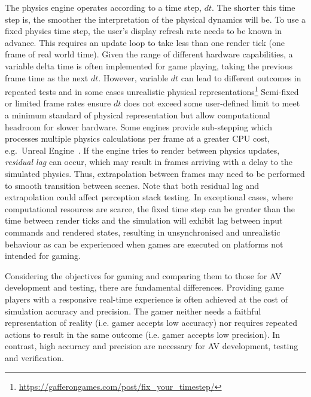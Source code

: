The physics engine operates according to a time step, $dt$. The shorter this time step is, the smoother the interpretation of the physical dynamics will be. To use a fixed physics time step, the user's display refresh rate needs to be known in advance. This requires an update loop to take less than one render tick (one frame of real world time). Given the range of different hardware capabilities, a variable delta time is often implemented for game playing, taking the previous frame time as the next $dt$. However, variable $dt$ can lead to different outcomes in repeated tests and in some cases unrealistic physical representations\DIFdelbegin {}\DIFdelend \DIFaddbegin \footnote{\url{https://gafferongames.com/post/fix_your_timestep/}}\DIFaddend %
Semi-fixed or limited frame rates ensure $dt$ does not exceed some user-defined limit to meet a minimum standard of physical representation but allow computational headroom for slower hardware. Some engines provide sub-stepping which processes multiple physics calculations per frame at a greater CPU cost, e.g.\ Unreal Engine~\cite{UE4_substepping}. If the engine tries to render between physics updates, \textit{residual lag} can occur, which may result in frames arriving with a delay to the simulated physics. Thus, extrapolation between frames may need to be performed to smooth transition between scenes. Note that both residual lag and extrapolation could affect perception stack testing. In exceptional cases, where computational resources are scarce, the fixed time step can be greater than the time between render ticks and the simulation will exhibit lag between input commands and rendered states, resulting in unsynchronised and unrealistic behaviour as can be experienced when games are executed on platforms not intended for gaming. 

Considering the objectives for gaming and comparing them to those for AV development and testing, there are fundamental differences. Providing game players with a responsive real-time experience is often achieved at the cost of simulation accuracy and precision.
% 
The gamer neither needs a faithful representation of reality (i.e. gamer accepts low accuracy) nor requires repeated actions to result in the same outcome (i.e. gamer accepts low precision). In contrast, high accuracy and precision are necessary for AV development, testing and verification.

